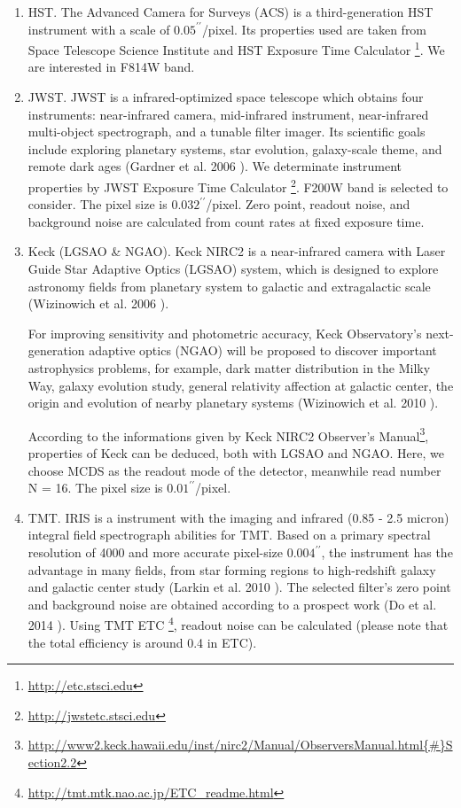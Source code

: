 \documentclass[a4paper,11pt]{article}
\begin{document}
\begin{enumerate}

\item  HST. The Advanced Camera for Surveys (ACS) is a
    third-generation HST instrument with a scale of
    $0.05^{\prime\prime}$/pixel. Its properties used are taken from
    Space Telescope Science Institute and HST Exposure Time Calculator
    \footnote{\url{http://etc.stsci.edu}}. We are interested in F814W
    band.
    
\item JWST. JWST is a infrared-optimized space telescope which obtains four instruments: near-infrared camera, mid-infrared instrument, near-infrared multi-object spectrograph, and a tunable filter imager. Its scientific goals include exploring planetary systems, star evolution, galaxy-scale theme, and remote dark ages (Gardner et al. 2006 \cite{2006SSRv..123..485G}). We determinate instrument properties by JWST Exposure Time Calculator \footnote{\url{http://jwstetc.stsci.edu}}. F200W band is selected to consider. The pixel size is $0.032^{\prime\prime}$/pixel. Zero point, readout noise, and background noise are calculated from count rates at fixed exposure time.

\item Keck (LGSAO \& NGAO). Keck NIRC2 is a near-infrared camera with Laser Guide Star Adaptive Optics (LGSAO) system, which is designed to explore astronomy fields from planetary system to galactic and extragalactic scale (Wizinowich et al. 2006 \cite{2006PASP..118..297W}).

	     For improving sensitivity and photometric accuracy, Keck Observatory's next-generation adaptive optics (NGAO) will be proposed to discover important astrophysics problems, for example, dark matter distribution in the Milky Way, galaxy evolution study, general relativity affection at galactic center, the origin and evolution of nearby planetary systems (Wizinowich et al. 2010 \cite{2010SPIE.7736E..0KW}).

	    According to the informations given by Keck NIRC2 Observer's Manual\footnote{\url{http://www2.keck.hawaii.edu/inst/nirc2/Manual/ObserversManual.html{\#}Section2.2}}, properties of Keck can be deduced, both with LGSAO and NGAO. Here, we choose MCDS as the readout mode of the detector, meanwhile read number N = 16. The pixel size is $0.01^{\prime\prime}$/pixel.
    
\item TMT. IRIS is a instrument with the imaging and infrared (0.85 - 2.5 micron) integral field spectrograph abilities for TMT. Based on a primary spectral resolution of 4000 and more accurate pixel-size $0.004^{\prime\prime}$, the instrument has the advantage in many fields, from star forming regions to high-redshift galaxy and galactic center study (Larkin et al. 2010 \cite{2010SPIE.7735E..29L}). The selected filter's zero point and background noise are obtained according to a prospect work (Do et al. 2014 \cite{2014AJ....147...93D}). Using TMT ETC \footnote{\url{http://tmt.mtk.nao.ac.jp/ETC_readme.html}}, readout noise can be calculated (please note that the total efficiency is around 0.4 in ETC). 
    

\end{enumerate}
\end{document}
